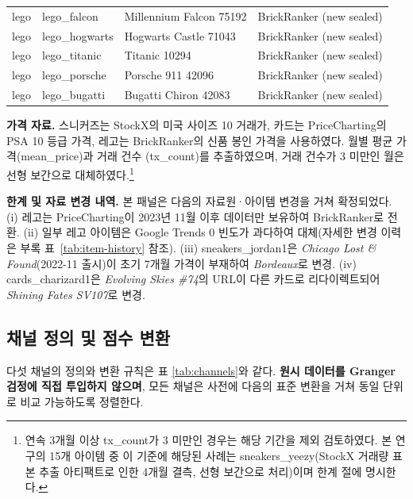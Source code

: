 \documentclass[11pt, a4paper, twocolumn]{article}
\begin{document}
\begin{table}[!tbp]
\begin{tabular}{llll}
\midrule
lego     & lego\_falcon      & Millennium Falcon 75192              & BrickRanker (new sealed) \\
lego     & lego\_hogwarts    & Hogwarts Castle 71043                & BrickRanker (new sealed) \\
lego     & lego\_titanic     & Titanic 10294                        & BrickRanker (new sealed) \\
lego     & lego\_porsche     & Porsche 911 42096                    & BrickRanker (new sealed) \\
lego     & lego\_bugatti     & Bugatti Chiron 42083                 & BrickRanker (new sealed) \\
\bottomrule
\end{tabular}
\end{table}

\textbf{가격 자료.} 스니커즈는 StockX의 미국 사이즈 10 거래가, 카드는
PriceCharting의 PSA 10 등급 가격, 레고는 BrickRanker의 신품 봉인
가격을 사용하였다. 월별 평균 가격(\textsf{mean\_price})과 거래 건수
(\textsf{tx\_count})를 추출하였으며, 거래 건수가 3 미만인 월은 선형
보간으로 대체하였다.\footnote{연속 3개월 이상 \textsf{tx\_count}가 3
미만인 경우는 해당 기간을 제외 검토하였다. 본 연구의 15개 아이템 중
이 기준에 해당된 사례는 \textsf{sneakers\_yeezy}(StockX 거래량 표본
추출 아티팩트로 인한 4개월 결측, 선형 보간으로 처리)이며 한계 절에
명시한다.}

\textbf{한계 및 자료 변경 내역.} 본 패널은 다음의 자료원·아이템 변경을
거쳐 확정되었다. (i) 레고는 PriceCharting이 2023년 11월 이후 데이터만
보유하여 BrickRanker로 전환. (ii) 일부 레고 아이템은 Google Trends 0
빈도가 과다하여 대체(자세한 변경 이력은 부록 표~\ref{tab:item-history} 참조).
(iii) \textsf{sneakers\_jordan1}은 \emph{Chicago Lost \& Found}(2022-11
출시)이 초기 7개월 가격이 부재하여 \emph{Bordeaux}로 변경.
(iv) \textsf{cards\_charizard1}은 \emph{Evolving Skies \#74}의 URL이
다른 카드로 리다이렉트되어 \emph{Shining Fates SV107}로 변경.

\subsection{채널 정의 및 점수 변환}\label{sec:method-channels}

다섯 채널의 정의와 변환 규칙은 표 \ref{tab:channels}와 같다.
\textbf{원시 데이터를 Granger 검정에 직접 투입하지 않으며}, 모든 채널은
사전에 다음의 표준 변환을 거쳐 동일 단위로 비교 가능하도록 정렬한다.
\end{document}
